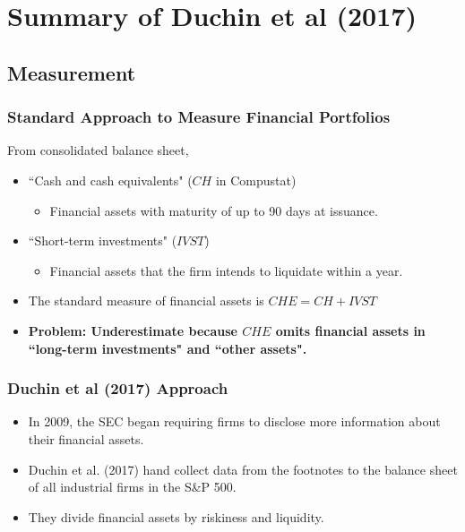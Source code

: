 \documentclass[handout]{beamer}
\begin{document}
\section{Summary of Duchin et al (2017)}

\subsection{Measurement}



\begin{frame}[label=standardapproach]
\frametitle{Standard Approach to Measure Financial Portfolios}
From consolidated balance sheet,
\bigskip
\begin{itemize}[<+->]
\item ``Cash and cash equivalents" ($CH$ in Compustat)
\begin{itemize}
\item Financial assets with maturity of up to 90 days at issuance.
\end{itemize}
\bigskip
\item ``Short-term investments" ($IVST$)
\begin{itemize}
\item Financial assets that the firm intends to liquidate within a year.
\end{itemize}

\bigskip
\item The standard measure of financial assets is $CHE = CH + IVST$

\bigskip

\item \textbf{Problem: Underestimate because $CHE$ omits financial assets in ``long-term investments" and ``other assets".}
\end{itemize}
\bigskip


\hyperlink{APPL2007}{}

\end{frame}


\begin{frame}[label=duchinapproach]
\frametitle{Duchin et al (2017) Approach}
\begin{itemize}[<+->]
\item In 2009, the SEC began requiring firms to disclose more information about their financial assets. \hyperlink{APPL2011}{}
\bigskip
\item Duchin et al. (2017) hand collect data from the footnotes to the balance sheet of all industrial firms in the S\&P 500. 
\bigskip
\item They divide financial assets by riskiness and liquidity. \hyperlink{classify}{}
\end{itemize}

\end{frame}
\end{document}
